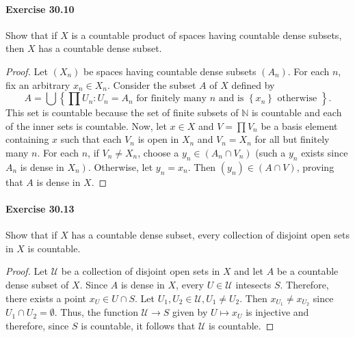 \documentclass{article}
\begin{document}
\paragraph{Exercise 30.10} Show that if $X$ is a countable product of spaces having countable dense subsets, then $X$ has a countable dense subset.
\begin{proof}
    Let $\left(X_n\right)$ be spaces having countable dense subsets $\left(A_n\right)$. For each $n$, fix an arbitrary $x_n \in X_n$. Consider the subset $A$ of $X$ defined by
$$
A=\bigcup\left\{\prod U_n: U_n=A_n \text { for finitely many } n \text { and is }\left\{x_n\right\} \text { otherwise }\right\} .
$$
This set is countable because the set of finite subsets of $\mathbb{N}$ is countable and each of the inner sets is countable. Now, let $x \in X$ and $V=\prod V_n$ be a basis element containing $x$ such that each $V_n$ is open in $X_n$ and $V_n=X_n$ for all but finitely many $n$. For each $n$, if $V_n \neq X_n$, choose a $y_n \in\left(A_n \cap V_n\right)$ (such a $y_n$ exists since $A_n$ is dense in $\left.X_n\right)$. Otherwise, let $y_n=x_n$. Then $\left(y_n\right) \in(A \cap V)$, proving that $A$ is dense in $X$.
\end{proof}



\paragraph{Exercise 30.13} Show that if $X$ has a countable dense subset, every collection of disjoint open sets in $X$ is countable.
\begin{proof}
    Let $\mathcal{U}$ be a collection of disjoint open sets in $X$ and let $A$ be a countable dense subset of $X$.
Since $A$ is dense in $X$, every $U \in \mathcal{U}$ intesects $S$. Therefore, there exists a point $x_U \in U \cap S$.
Let $U_1, U_2 \in \mathcal{U}, U_1 \neq U_2$. Then $x_{U_1} \neq x_{U_2}$ since $U_1 \cap U_2=\emptyset$.
Thus, the function $\mathcal{U} \rightarrow S$ given by $U \mapsto x_U$ is injective and therefore, since $S$ is countable, it follows that $\mathcal{U}$ is countable.
\end{proof}
\end{document}
